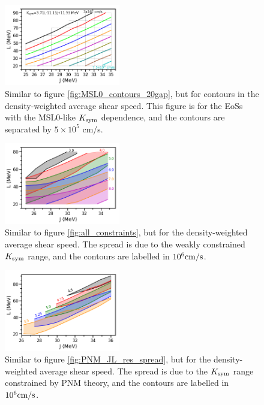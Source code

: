 \documentclass[fleqn,usenatbib]{mnras}
\begin{document}
\begin{figure}
\centering
\includegraphics[width=0.45\textwidth,angle=0]{avct_contours.png}
\caption{Similar to figure \ref{fig:MSL0_contours_20gap}, but for contours in the density-weighted average shear speed. This figure is for the EoSs with the MSL0-like $K_{\rm sym}$ dependence, and the contours are separated by $5\times 10^5$ cm/s.}
\label{fig:avct_JL_MSL0}
\end{figure}

\begin{figure}
\centering
\includegraphics[width=0.45\textwidth,angle=0]{avct_contours_Ksymspread_grid_v2.png}
\caption{Similar to figure \ref{fig:all_constraints}, but for the density-weighted average shear speed. The spread is due to the weakly constrained $K_{\rm sym}$ range, and the contours are labelled in $10^6 \rm{cm/s}$.}
\label{fig:avct_JL_grid}
\end{figure}

\begin{figure}
\centering
\includegraphics[width=0.45\textwidth,angle=0]{avct_contours_Ksymspread_PNM_v2.png}
\caption{Similar to figure \ref{fig:PNM_JL_res_spread}, but for the density-weighted average shear speed. The spread is due to the $K_{\rm sym}$ range constrained by PNM theory, and the contours are labelled in $10^6 \rm{cm/s}$.}
\label{fig:avct_JL_PNM}
\end{figure}
\end{document}
